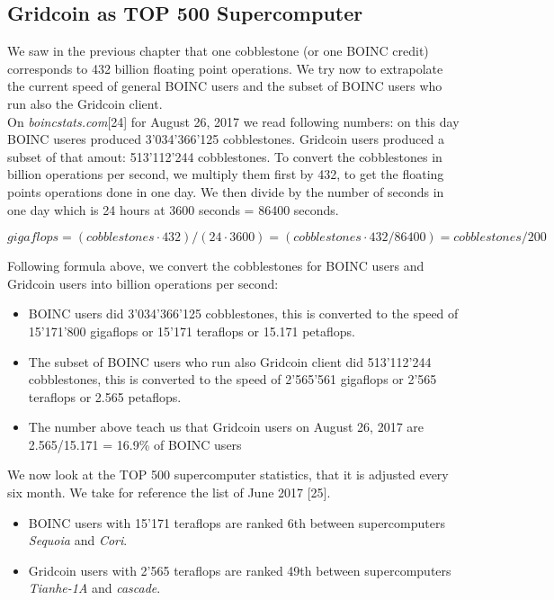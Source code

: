 \subsection{Gridcoin as TOP 500 Supercomputer}

We saw in the previous chapter that one cobblestone (or one BOINC credit) corresponds to 432 billion floating point operations. We try now to extrapolate the current speed of general BOINC users and the subset of BOINC users who run also the Gridcoin client.\\

On \textit{boincstats.com}[24] for August 26, 2017 we read following numbers: on this day BOINC useres produced 3'034'366'125 cobblestones. Gridcoin users produced a subset of that amout: 513'112'244 cobblestones. To convert the cobblestones in billion operations per second, we multiply them first by 432, to get the floating points operations done in one day. We then divide by the number of seconds in one day which is 24 hours at 3600 seconds = 86400 seconds.

\[ gigaflops = (cobblestones \cdot 432)/(24 \cdot 3600) = (cobblestones \cdot 432/86400) = cobblestones/200 \]

Following formula above, we convert the cobblestones for BOINC users and Gridcoin users into billion operations per second:

\begin{itemize}
	\item BOINC users did 3'034'366'125 cobblestones, this is converted to the speed of 15'171'800 gigaflops or 15'171 teraflops or 15.171 petaflops.
	\item The subset of BOINC users who run also Gridcoin client did 513'112'244 cobblestones, this is converted to the speed of 2'565'561 gigaflops or 2'565 teraflops or 2.565 petaflops.
	\item The number above teach us that Gridcoin users on August 26, 2017 are 2.565/15.171 = 16.9\% of BOINC users
\end{itemize}

We now look at the TOP 500 supercomputer statistics, that it is adjusted every six month. We take for reference the list of June 2017 [25].

\begin{itemize}
    \item BOINC users with 15'171 teraflops are ranked 6th between supercomputers \textit{Sequoia} and \textit{Cori}.
	\item Gridcoin users with 2'565 teraflops are ranked 49th between supercomputers \textit{Tianhe-1A} and \textit{cascade}.
\end{itemize}

